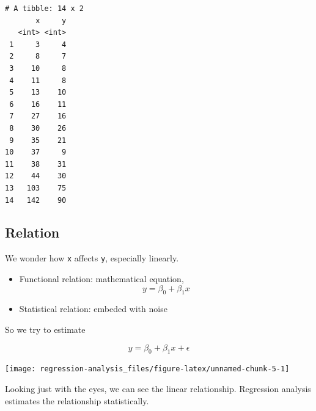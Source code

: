\documentclass[]{book}
\newenvironment{Shaded}{\begin{snugshade}}{\end{snugshade}}
\newcommand{\DataTypeTok}[1]{\textcolor[rgb]{0.13,0.29,0.53}{#1}}
\newcommand{\KeywordTok}[1]{\textcolor[rgb]{0.13,0.29,0.53}{\textbf{#1}}}
\newcommand{\NormalTok}[1]{#1}
\newcommand{\OperatorTok}[1]{\textcolor[rgb]{0.81,0.36,0.00}{\textbf{#1}}}
\newcommand{\StringTok}[1]{\textcolor[rgb]{0.31,0.60,0.02}{#1}}
\providecommand{\tightlist}{%
  \setlength{\itemsep}{0pt}\setlength{\parskip}{0pt}}
\theoremstyle{definition}
\theoremstyle{definition}
\theoremstyle{definition}
\theoremstyle{remark}
\begin{document}
\begin{verbatim}
# A tibble: 14 x 2
       x     y
   <int> <int>
 1     3     4
 2     8     7
 3    10     8
 4    11     8
 5    13    10
 6    16    11
 7    27    16
 8    30    26
 9    35    21
10    37     9
11    38    31
12    44    30
13   103    75
14   142    90
\end{verbatim}

\hypertarget{relation}{%
\subsection*{Relation}\label{relation}}

We wonder how \texttt{x} affects \texttt{y}, especially linearly.

\begin{itemize}
\tightlist
\item
  Functional relation: mathematical equation, \[y = \beta_0 + \beta_1 x\]
\item
  Statistical relation: embeded with noise
\end{itemize}

So we try to estimate

\[y = \beta_0 + \beta_1 x + \epsilon\]

\begin{Shaded}
\end{Shaded}

\begin{center}\texttt{[image: regression-analysis\_files/figure-latex/unnamed-chunk-5-1]} \end{center}

Looking just with the eyes, we can see the linear relationship. Regression analysis estimates the relationship statistically.

\begin{Shaded}
\end{Shaded}
\end{document}
